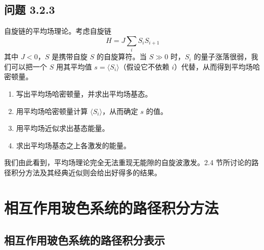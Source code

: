 \subsection*{问题 3.2.3}

自旋链的平均场理论。考虑自旋链
\begin{equation*}
H=J\sum_i S_iS_{i+1}
\end{equation*}
其中 $J<0$，$S$ 是携带自旋 $S$ 的自旋算符。当 $S\gg0$ 时，$S_i$ 的量子涨落很弱，我们可以把一个 $S$ 用其平均值 $s=\langle S_i\rangle$（假设它不依赖 $i$）代替，从而得到平均场哈密顿量。
\begin{enumerate}
\item 写出平均场哈密顿量，并求出平均场基态。
\item 用平均场哈密顿量计算 $\langle S_i\rangle$，从而确定 $s$ 的值。
\item 用平均场近似求出基态能量。
\item 求出平均场基态之上各激发的能量。
\end{enumerate}

我们由此看到，平均场理论完全无法重现无能隙的自旋波激发。2.4 节所讨论的路径积分方法及其经典近似则会给出好得多的结果。

\section{相互作用玻色系统的路径积分方法}

\subsection{相互作用玻色系统的路径积分表示}

